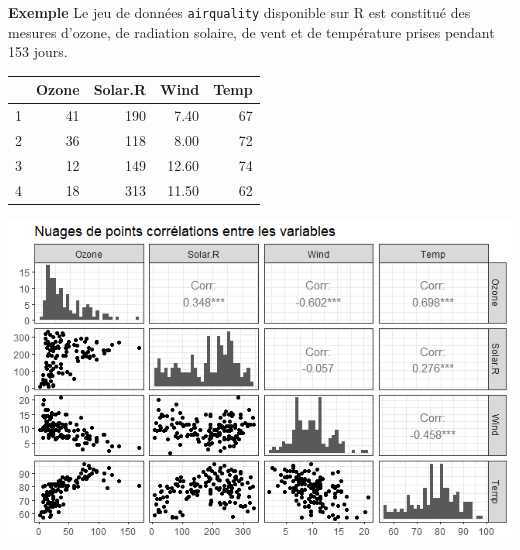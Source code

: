 \documentclass[aspectratio=169,xcolor=dvipsnames]{beamer}
\begin{document}
\begin{frame}
	\begin{exampleblock}{\textbf{Exemple}}
{\footnotesize 	Le jeu de données \texttt{airquality} disponible sur \textsf{R} est constitué des mesures d'ozone, de radiation solaire, de vent et de température prises pendant 153 jours.}
\begin{footnotesize}
		\begin{center}
		\begin{tabular}{rrrrr}
  			\hline
 		& Ozone & Solar.R & Wind & Temp \\[-3pt] 
  		\hline
		1 &  41 & 190 & 7.40 &  67 \\[-3pt]  
  		2 &  36 & 118 & 8.00 &  72 \\[-3pt]  
  		3 &  12 & 149 & 12.60 &  74 \\[-3pt]  
  		4 &  18 & 313 & 11.50 &  62 \\[-3pt]  
   		\hline
		\end{tabular}
		\end{center}
		
		\begin{center}
		\includegraphics[scale=0.3]{cor_air_quality.png}
		\end{center}
\end{footnotesize}
	\end{exampleblock}
\end{frame}
\end{document}
